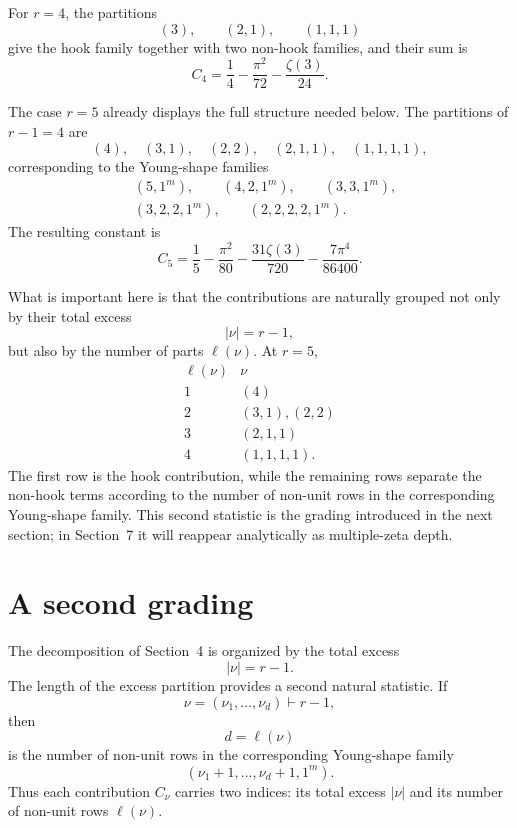 \documentclass[11pt]{article}
\theoremstyle{definition}
\begin{document}
For $r=4$, the partitions
\[
        (3),\qquad(2,1),\qquad(1,1,1)
\]
give the hook family together with two non-hook families, and their
sum is
\[
        C_4
        =
        \frac14-\frac{\pi^2}{72}
        -\frac{\zeta(3)}{24}.
\]

The case $r=5$ already displays the full structure needed below.  The
partitions of $r-1=4$ are
\[
        (4),\quad(3,1),\quad(2,2),\quad
        (2,1,1),\quad(1,1,1,1),
\]
corresponding to the Young-shape families
\[
\begin{split}
 &(5,1^m),\qquad
 (4,2,1^m),\qquad
 (3,3,1^m),\\
 &(3,2,2,1^m),\qquad
 (2,2,2,2,1^m).
\end{split}
\]
The resulting constant is
\begin{equation}\label{eq:C5}
 C_5
 =
 \frac15-\frac{\pi^2}{80}
 -\frac{31\zeta(3)}{720}
 -\frac{7\pi^4}{86400}.
\end{equation}

What is important here is that the contributions are naturally
grouped not only by their total excess
\[
        |\nu|=r-1,
\]
but also by the number of parts $\ell(\nu)$.  At $r=5$,
\[
\begin{array}{c|c}
\ell(\nu) & \nu \\ \hline
1 &(4)\\
2 &(3,1),(2,2)\\
3 &(2,1,1)\\
4 &(1,1,1,1).
\end{array}
\]
The first row is the hook contribution, while the remaining rows
separate the non-hook terms according to the number of non-unit rows
in the corresponding Young-shape family.  This second statistic is
the grading introduced in the next section; in Section~7 it will
reappear analytically as multiple-zeta depth.
\section{A second grading}
\label{sec:second-grading}

The decomposition of Section~4 is organized by the total excess
\[
        |\nu|=r-1.
\]
The length of the excess partition provides a second natural
statistic.  If
\[
        \nu=(\nu_1,\ldots,\nu_d)\vdash r-1,
\]
then
\[
        d=\ell(\nu)
\]
is the number of non-unit rows in the corresponding Young-shape family
\[
        (\nu_1+1,\ldots,\nu_d+1,1^m).
\]
Thus each contribution $C_\nu$ carries two indices: its total excess
$|\nu|$ and its number of non-unit rows $\ell(\nu)$.
\end{document}
